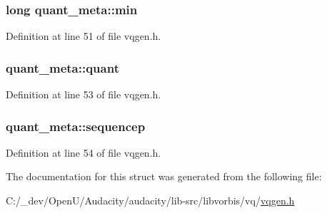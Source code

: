\subsubsection[{\texorpdfstring{min}{min}}]{\setlength{\rightskip}{0pt plus 5cm}long quant\+\_\+meta\+::min}\hypertarget{structquant__meta_a5994b11f43c8e9582499578b39db0ff4}{}\label{structquant__meta_a5994b11f43c8e9582499578b39db0ff4}


Definition at line 51 of file vqgen.\+h.

\subsubsection[{\texorpdfstring{quant}{quant}}]{ quant\+\_\+meta\+::quant}\hypertarget{structquant__meta_ac6db75436255c267e1db09b1f24fc634}{}\label{structquant__meta_ac6db75436255c267e1db09b1f24fc634}


Definition at line 53 of file vqgen.\+h.

\subsubsection[{\texorpdfstring{sequencep}{sequencep}}]{ quant\+\_\+meta\+::sequencep}\hypertarget{structquant__meta_a6dc0b2157fe56a9436af5818ca221de9}{}\label{structquant__meta_a6dc0b2157fe56a9436af5818ca221de9}


Definition at line 54 of file vqgen.\+h.



The documentation for this struct was generated from the following file\+:\begin{DoxyCompactItemize}
\item 
C\+:/\+\_\+dev/\+Open\+U/\+Audacity/audacity/lib-\/src/libvorbis/vq/\hyperlink{vqgen_8h}{vqgen.\+h}\end{DoxyCompactItemize}
